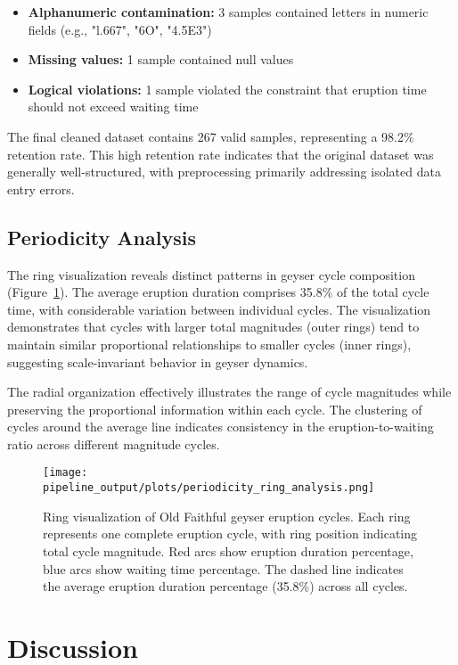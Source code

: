 \documentclass[fleqn,10pt]{olplainarticle}
\begin{document}
\begin{itemize}
\item \textbf{Alphanumeric contamination:} 3 samples contained letters in numeric fields (e.g., "l.667", "6O", "4.5E3")
\item \textbf{Missing values:} 1 sample contained null values
\item \textbf{Logical violations:} 1 sample violated the constraint that eruption time should not exceed waiting time
\end{itemize}

The final cleaned dataset contains 267 valid samples, representing a 98.2\% retention rate. This high retention rate indicates that the original dataset was generally well-structured, with preprocessing primarily addressing isolated data entry errors.

\subsection*{Periodicity Analysis}
The ring visualization reveals distinct patterns in geyser cycle composition (Figure~\ref{fig:periodicity}). The average eruption duration comprises 35.8\% of the total cycle time, with considerable variation between individual cycles. The visualization demonstrates that cycles with larger total magnitudes (outer rings) tend to maintain similar proportional relationships to smaller cycles (inner rings), suggesting scale-invariant behavior in geyser dynamics.

The radial organization effectively illustrates the range of cycle magnitudes while preserving the proportional information within each cycle. The clustering of cycles around the average line indicates consistency in the eruption-to-waiting ratio across different magnitude cycles.

\begin{figure}[ht]
\centering
\texttt{[image: pipeline\_output/plots/periodicity\_ring\_analysis.png]}
\caption{Ring visualization of Old Faithful geyser eruption cycles. Each ring represents one complete eruption cycle, with ring position indicating total cycle magnitude. Red arcs show eruption duration percentage, blue arcs show waiting time percentage. The dashed line indicates the average eruption duration percentage (35.8\%) across all cycles.}
\label{fig:periodicity}
\end{figure}

\section*{Discussion}
\end{document}
